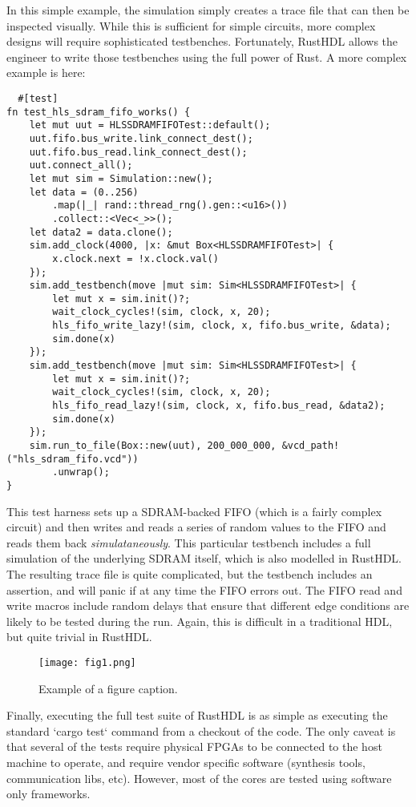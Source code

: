 \documentclass[conference]{IEEEtran}
\begin{document}
In this simple example, the simulation simply creates a trace file that can then be inspected visually.  While this 
is sufficient for simple circuits, more complex designs will require sophisticated testbenches.  Fortunately, RustHDL
allows the engineer to write those testbenches using the full power of Rust.  A more complex example is here:

\begin{verbatim}
  #[test]
fn test_hls_sdram_fifo_works() {
    let mut uut = HLSSDRAMFIFOTest::default();
    uut.fifo.bus_write.link_connect_dest();
    uut.fifo.bus_read.link_connect_dest();
    uut.connect_all();
    let mut sim = Simulation::new();
    let data = (0..256)
        .map(|_| rand::thread_rng().gen::<u16>())
        .collect::<Vec<_>>();
    let data2 = data.clone();
    sim.add_clock(4000, |x: &mut Box<HLSSDRAMFIFOTest>| {
        x.clock.next = !x.clock.val()
    });
    sim.add_testbench(move |mut sim: Sim<HLSSDRAMFIFOTest>| {
        let mut x = sim.init()?;
        wait_clock_cycles!(sim, clock, x, 20);
        hls_fifo_write_lazy!(sim, clock, x, fifo.bus_write, &data);
        sim.done(x)
    });
    sim.add_testbench(move |mut sim: Sim<HLSSDRAMFIFOTest>| {
        let mut x = sim.init()?;
        wait_clock_cycles!(sim, clock, x, 20);
        hls_fifo_read_lazy!(sim, clock, x, fifo.bus_read, &data2);
        sim.done(x)
    });
    sim.run_to_file(Box::new(uut), 200_000_000, &vcd_path!("hls_sdram_fifo.vcd"))
        .unwrap();
}
\end{verbatim}

This test harness sets up a SDRAM-backed FIFO (which is a fairly complex circuit) and then writes and reads a 
series of random values to the FIFO and reads them back \emph{simulataneously}.  This particular testbench includes
a full simulation of the underlying SDRAM itself, which is also modelled in RustHDL.  The resulting trace file is
quite complicated, but the testbench includes an assertion, and will panic if at any time the FIFO errors out.  The 
FIFO read and write macros include random delays that ensure that different edge conditions are likely to be tested 
during the run.  Again, this is difficult in a traditional HDL, but quite trivial in RustHDL.

\begin{figure}[htbp]
  \centerline{\texttt{[image: fig1.png]}}
  \caption{Example of a figure caption.}
  \label{fig}
\end{figure}
  
Finally, executing the full test suite of RustHDL is as simple as executing the standard `cargo test` command from a 
checkout of the code.  The only caveat is that several of the tests require physical FPGAs to be connected to the host
machine to operate, and require vendor specific software (synthesis tools, communication libs, etc).  However, most 
of the cores are tested using software only frameworks.
\end{document}
